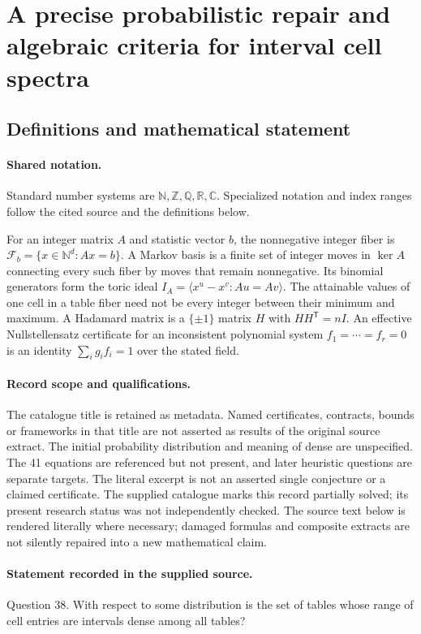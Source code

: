 \documentclass[11pt]{article}
\begin{document}
\section{A precise probabilistic repair and algebraic criteria for interval cell spectra}\label{statement}

\subsection{Definitions and mathematical statement}

\paragraph{Shared notation.}Standard number systems are $\mathbb N,\mathbb Z,\mathbb Q,\mathbb R,\mathbb C$. Specialized notation and index ranges follow the cited source and the definitions below.


For an integer matrix $A$ and statistic vector $b$, the nonnegative integer fiber is $\mathcal F_b=\{x\in\mathbb N^d:Ax=b\}$. A Markov basis is a finite set of integer moves in $\ker A$ connecting every such fiber by moves that remain nonnegative. Its binomial generators form the toric ideal $I_A=\langle x^u-x^v:Au=Av\rangle$. The attainable values of one cell in a table fiber need not be every integer between their minimum and maximum. A Hadamard matrix is a $\{\pm1\}$ matrix $H$ with $HH^{\mathsf T}=nI$. An effective Nullstellensatz certificate for an inconsistent polynomial system $f_1=\cdots=f_r=0$ is an identity $\sum_i g_if_i=1$ over the stated field.
\paragraph{Record scope and qualifications.}
The catalogue title is retained as metadata. Named certificates, contracts, bounds or frameworks in that title are not asserted as results of the original source extract.
The initial probability distribution and meaning of dense are unspecified. The 41 equations are referenced but not present, and later heuristic questions are separate targets. The literal excerpt is not an asserted single conjecture or a claimed certificate. The supplied catalogue marks this record partially solved; its present research status was not independently checked.
The source text below is rendered literally where necessary; damaged formulas and composite extracts are not silently repaired into a new mathematical claim.
\paragraph{Statement recorded in the supplied source.}
Question 38. With respect to some distribution is the set of tables whose range of cell entries are intervals dense among all tables?
\end{document}
